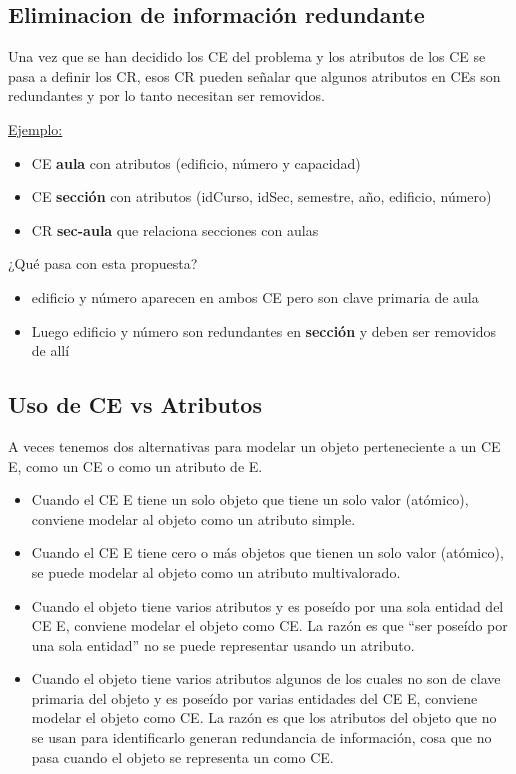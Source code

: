 \documentclass[12pt,a4paper]{report}
\begin{document}
		\subsection{Eliminacion de información redundante}
			Una vez que se han decidido los CE del problema y los atributos de los CE se pasa a definir los CR, esos CR pueden señalar que algunos atributos en CEs son redundantes y por lo tanto necesitan ser removidos.
			
			\underline{Ejemplo:}
			\begin{itemize}
				\item CE \textbf{aula} con atributos (edificio, número y capacidad)
				\item CE \textbf{sección} con atributos (idCurso, idSec, semestre, año, edificio, número)
				\item CR \textbf{sec-aula} que relaciona secciones con aulas
				\end{itemize}
				
				\par ¿Qué pasa con esta propuesta?
				\begin{itemize}
				\item edificio y número aparecen en ambos CE pero son clave primaria de aula
				\item Luego edificio y número son redundantes en \textbf{sección} y deben ser removidos de allí
				\end{itemize}	

		\subsection{Uso de CE vs Atributos}
			A veces tenemos dos alternativas para modelar un objeto perteneciente a un CE E, como un CE o como un atributo de E.
			\begin{itemize}
				\item Cuando el CE E tiene un solo objeto que tiene un solo valor (atómico), conviene modelar al objeto como un atributo simple.
				\item Cuando el CE E tiene cero o más objetos que tienen un solo valor (atómico), se puede modelar al objeto como un atributo multivalorado.
				
				\item Cuando el objeto tiene varios atributos y es poseído por una sola entidad del CE E, conviene modelar el objeto como CE. La razón es que “ser poseído por una sola entidad” no se puede representar usando un atributo.
				\item Cuando el objeto tiene varios atributos algunos de los cuales no son de clave primaria del objeto y es poseído por varias entidades del CE E, conviene modelar el objeto como CE. La razón es que los atributos del objeto que no se usan para identificarlo generan redundancia de información, cosa que no pasa cuando el objeto se representa un como CE.
			\end{itemize}
			
\end{document}
